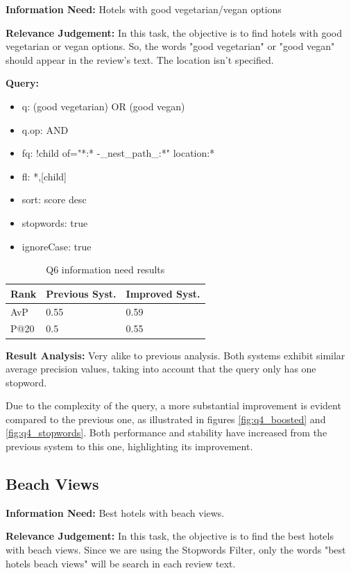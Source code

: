 \documentclass[sigconf]{acmart}
\begin{document}
\textbf{Information Need:} Hotels with good vegetarian/vegan options

\textbf{Relevance Judgement:} In this task, the objective is to find hotels with good vegetarian or vegan options. So, the words "good vegetarian" or "good vegan" should appear in the review's text. The location isn't specified.

\textbf{Query:}

\begin{itemize}
    \item q: (good vegetarian) OR (good vegan)
    \item q.op: AND
    \item fq: {!child of="*:* -\_nest\_path\_:*"} location:*
    \item fl: *,[child]
    \item sort: score desc
    \item stopwords: true
    \item ignoreCase: true
\end{itemize}

\begin{table}[H]
\caption{Q6 information need results}
\label{tab:q6}
\begin{tabular}{lll}
\toprule
Rank & Previous Syst. & Improved Syst.\\
\midrule
AvP & 0.55 & 0.59  \\
P@20 & 0.5 & 0.55 \\
\bottomrule
\end{tabular}
\end{table}

\textbf{Result Analysis:} Very alike to previous analysis. Both systems exhibit similar average precision values, taking into account that the query only has one stopword.

Due to the complexity of the query, a more substantial improvement is evident compared to the previous one, as illustrated in figures \ref{fig:q4_boosted} and \ref{fig:q4_stopwords}. Both performance and stability have increased from the previous system to this one, highlighting its improvement.

\subsection{Beach Views}

\textbf{Information Need:} Best hotels with beach views.

\textbf{Relevance Judgement:} In this task, the objective is to find the best hotels with beach views. Since we are using the Stopwords Filter, only the words "best hotels beach views" will be search in each review text.
\end{document}
